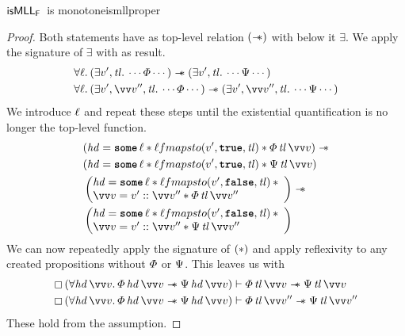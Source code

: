 \documentclass[thesis.tex]{subfiles}
\begin{document}
\begin{example}{$\textsf{\upshape isMLL}_{\textsf{\upshape F}}$\ is monotone}{ismllproper}
\begin{proof}
        Both statements have as top-level relation $(\mathrel{-\!\!\ast})$ with below it $\exists$. We apply the signature of $\exists$ with as result.
        \begin{align*}
             & \All \loc. (\Exists \val', \tl. \cdots \pred \cdots) \wand (\Exists \val', \tl. \cdots \predB \cdots)                               \\
             & \All \loc. (\Exists \val', \vect{\val}'', \tl. \cdots \pred \cdots) \wand (\Exists \val', \vect{\val}'', \tl. \cdots \predB \cdots)
        \end{align*}
        We introduce $\ell$ and repeat these steps until the existential quantification is no longer the top-level function.
        \begin{align*}
             & (\hd = \Some \loc * \loc fmapsto (\val', \True, \tl) * \pred\, \tl\, \vect{\val}) \wand \\
             & (\hd = \Some \loc * \loc fmapsto (\val', \True, \tl) * \predB\, \tl\, \vect{\val})      \\
             &
            \left(\begin{array}{@{}l}
                          \hd = \Some \loc * \loc fmapsto (\val', \False, \tl)\spac * \\
                          \vect{\val} = \val' :: \vect{\val}'' * \pred\, \tl\, \vect{\val}''
                      \end{array}\right)
            \wand                                                                                      \\
             & \left(\begin{array}{@{}l}
                             \hd = \Some \loc * \loc fmapsto (\val', \False, \tl)\spac * \\
                             \vect{\val} = \val' :: \vect{\val}'' * \predB\, \tl\, \vect{\val}''
                         \end{array}\right)
        \end{align*}
        We can now repeatedly apply the signature of $(*)$ and apply reflexivity to any created propositions without $\varPhi$ or $\Psi$. This leaves us with
        \begin{align*}
            \always{(\All \hd\, \vect{v}. \pred\, \hd\, \vect{v} \wand \predB\, \hd\, \vect{v})} & \proves \pred\, \tl\, \vect{\val} \wand \predB\, \tl\, \vect{\val}     \\
            \always{(\All \hd\, \vect{v}. \pred\, \hd\, \vect{v} \wand \predB\, \hd\, \vect{v})} & \proves \pred\, \tl\, \vect{\val}'' \wand \predB\, \tl\, \vect{\val}''
        \end{align*}
        These hold from the assumption.
    \end{proof}
\end{example}
\end{document}
